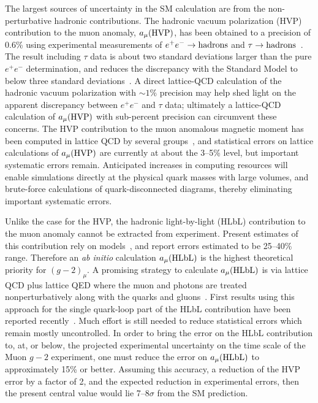 \begin{itemize}
The largest sources of uncertainty in the SM calculation are from the non-perturbative hadronic contributions.
The hadronic vacuum polarization (HVP) contribution to the muon anomaly, $a_{\mu}(\rm HVP)$, has been obtained to a precision of 0.6\% using experimental measurements of $e^{+}e^{-}\to\rm hadrons$ and $\tau\to\rm hadrons$~\cite{Davier:2010nc,Hagiwara:2011af}.
The result including $\tau$ data is about two standard deviations larger than the pure $e^+e^-$
determination, and reduces the discrepancy with the Standard Model to below three standard
deviations~\cite{Davier:2010nc}.
A direct lattice-QCD calculation of the hadronic vacuum polarization with $\sim 1\%$ precision may help shed
light on the apparent discrepancy between $e^{+}e^{-}$ and $\tau$ data;
ultimately a lattice-QCD calculation of $a_{\mu}(\rm HVP)$ with sub-percent precision can circumvent these
concerns.  The HVP contribution to the muon anomalous magnetic moment has been computed in lattice QCD by several groups~\cite{Blum:2002ii,Gockeler:2003cw,Aubin:2006xv,Feng:2011zk,Boyle:2011hu,DellaMorte:2011aa,Burger:2013jya}, and statistical errors on lattice calculations of $a_{\mu}(\rm HVP)$ are currently
at about the 3--5\% level, but important systematic errors remain. Anticipated increases in computing resources will enable simulations directly at the physical quark masses with large volumes, and brute-force calculations of quark-disconnected diagrams, thereby eliminating important systematic errors.

Unlike the case for the HVP, the hadronic light-by-light (HLbL) contribution to the muon anomaly cannot be extracted from experiment. Present estimates of this contribution rely on models~\cite{Prades:2009tw,Nyffeler:2009tw}, and report errors estimated to be 25--40\% range.
Therefore an \emph{ab initio} calculation $a_\mu({\rm HLbL})$ is the highest theoretical priority for $(g-2)_\mu$.
A promising strategy to calculate $a_\mu({\rm HLbL})$ is via lattice QCD plus lattice QED where
the muon and photons are treated nonperturbatively along with the quarks and
gluons~\cite{Hayakawa:2005eq}.
First results using this approach for the single quark-loop part of the HLbL contribution
have been reported recently~\cite{Blum:2013qu}.
Much effort is still needed to reduce statistical errors which remain mostly uncontrolled.
In order to bring the error on the HLbL contribution to, at, or below, the projected experimental uncertainty
on the time scale of the Muon $g-2$ experiment, one must reduce the error on $a_\mu({\rm HLbL})$ to
approximately 15\% or better.
Assuming this accuracy, a reduction of the HVP error by a factor of 2, and the expected reduction in
experimental errors, then the present central value would lie 7--8$\sigma$ from the SM prediction.


\end{itemize}
